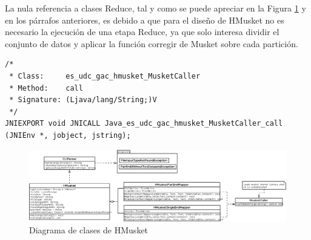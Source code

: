 \documentclass[conference]{IEEEtran}
\begin{document}
La nula referencia a clases Reduce, tal y como se puede apreciar en la Figura \ref{class_diagram} y en los párrafos anteriores, es debido a que para el diseño de HMusket no es necesario la ejecución de una etapa Reduce, ya que solo interesa dividir el conjunto de datos y aplicar la función corregir de Musket sobre cada partición.

\begin{lstlisting}[style=CStyle, caption=Cabecera JNI generada, label=jni_header]
/*
 * Class:     es_udc_gac_hmusket_MusketCaller
 * Method:    call
 * Signature: (Ljava/lang/String;)V
 */
JNIEXPORT void JNICALL Java_es_udc_gac_hmusket_MusketCaller_call (JNIEnv *, jobject, jstring);
\end{lstlisting}

\begin{figure}
	\includegraphics[width=\textwidth]{figures/hmusket.png}
	\caption{Diagrama de clases de HMusket}
	\label{class_diagram}
\end{figure}
\end{document}
